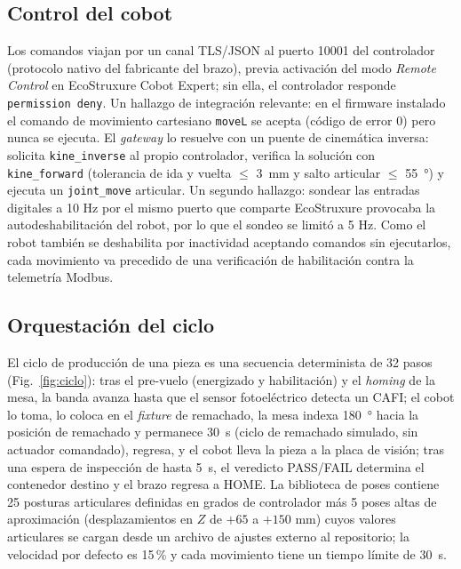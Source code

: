 \documentclass{styles/svproc}
\begin{document}
\subsection{Control del cobot}
Los comandos viajan por un canal TLS/JSON al puerto 10001 del controlador
(protocolo nativo del fabricante del brazo), previa activación del modo
\emph{Remote Control} en EcoStruxure Cobot Expert; sin ella, el controlador
responde \texttt{permission deny}. Un hallazgo de integración relevante:
en el firmware instalado el comando de movimiento cartesiano \texttt{moveL}
se acepta (código de error 0) pero nunca se ejecuta. El
\emph{gateway} lo resuelve con un puente de cinemática inversa: solicita
\texttt{kine\_inverse} al propio controlador, verifica la solución con
\texttt{kine\_forward} (tolerancia de ida y vuelta $\leq$
\SI{3}{\milli\metre} y salto articular $\leq$ \SI{55}{\degree}) y ejecuta un
\texttt{joint\_move} articular. Un segundo hallazgo: sondear las entradas
digitales a 10 Hz por el mismo puerto que comparte EcoStruxure provocaba la
autodeshabilitación del robot, por lo que el sondeo se limitó a 5 Hz.
Como el robot también se deshabilita por inactividad aceptando comandos sin
ejecutarlos, cada movimiento va precedido de una verificación de
habilitación contra la telemetría Modbus.

\subsection{Orquestación del ciclo}
El ciclo de producción de una pieza es una secuencia determinista de 32
pasos (Fig.~\ref{fig:ciclo}): tras el pre-vuelo (energizado y habilitación)
y el \emph{homing} de la mesa, la banda avanza hasta que el sensor
fotoeléctrico detecta un CAFI; el cobot lo toma, lo coloca en el
\emph{fixture} de remachado, la mesa indexa \SI{180}{\degree} hacia la
posición de remachado y permanece \SI{30}{\second} (ciclo de remachado
simulado, sin actuador comandado), regresa, y el cobot lleva la pieza a la placa de visión; tras
una espera de inspección de hasta \SI{5}{\second}, el veredicto PASS/FAIL
determina el contenedor destino y el brazo regresa a HOME. La biblioteca de
poses contiene 25 posturas articulares definidas en grados de controlador
más 5 poses altas de aproximación (desplazamientos en $Z$ de $+65$ a
$+150$ \si{\milli\metre}) cuyos valores articulares se cargan desde un
archivo de ajustes externo al repositorio; la velocidad por defecto es
15\,\% y cada movimiento tiene un tiempo límite de \SI{30}{\second}.
\end{document}
